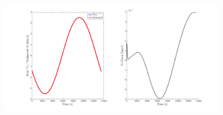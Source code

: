 \begin{figure}[H]
    \centering
    \includegraphics[width=\textwidth]{Figures/VZ_error-50km-1obs.png}
    \caption{}
    \label{fig: vzerror-50-1}
\end{figure}


